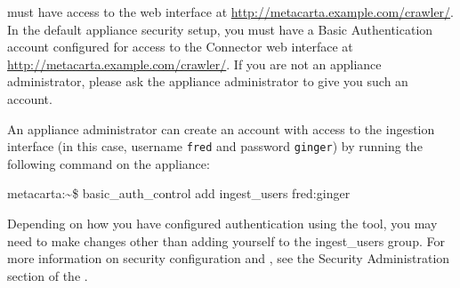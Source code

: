 %
%

must have
access to the web interface at
\url{http://metacarta.example.com/crawler/}. In the default appliance
security setup, you must have a Basic Authentication account
configured for access to the Connector web interface at
\url{http://metacarta.example.com/crawler/}.  If you are not an appliance
administrator, please ask the appliance administrator to give you such
an account.

An appliance administrator can create an account with access to the
ingestion interface (in this case, username {\tt fred} and password
{\tt ginger}) by running the following command on the appliance:

\begin{console}
metacarta:\~{}\$ basic\_auth\_control add ingest\_users fred:ginger 
\end{console}

Depending on how you have configured authentication using the
 tool, you may need to make changes other than
adding yourself to the ingest\_users group. For more information on
security configuration and , see the Security
Administration section of the .
